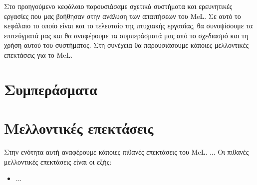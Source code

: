 
Στο προηγούμενο κεφάλαιο παρουσιάσαμε σχετικά συστήματα και ερευνητικές εργασίες που μας βοήθησαν στην ανάλυση των απαιτήσεων του \textlatin{MeL}.  Σε αυτό το κεφάλαιο το οποίο είναι και το τελευταίο της πτυχιακής εργασίας, θα συνοψίσουμε τα επιτεύγματά μας και θα αναφέρουμε τα συμπεράσματά μας από το σχεδιασμό και τη χρήση αυτού του συστήματος. Στη συνέχεια θα παρουσιάσουμε κάποιες μελλοντικές επεκτάσεις για το \textlatin{MeL}.

\section{Συμπεράσματα}


\section{Μελλοντικές επεκτάσεις}
Στην ενότητα αυτή αναφέρουμε κάποιες πιθανές επεκτάσεις του \textlatin{MeL}. ... Οι πιθανές μελλοντικές επεκτάσεις είναι οι εξής: 

\begin{itemize}
  \item
...
\end{itemize}